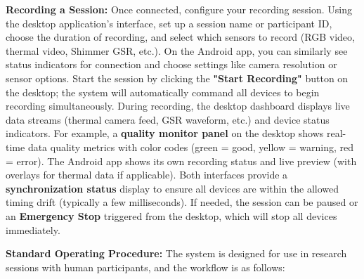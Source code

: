 \textbf{Recording a Session:} Once connected, configure your recording
session. Using the desktop application's interface, set up a session
name or participant ID, choose the duration of recording, and select
which sensors to record (RGB video, thermal video, Shimmer GSR,
etc.)\cite{GSRGuideIMotions}.
On the Android app, you can similarly see status indicators for
connection and choose settings like camera resolution or sensor options.
Start the session by clicking the \textbf{"Start Recording"} button on the
desktop; the system will automatically command all devices to begin
recording simultaneously. During recording, the desktop dashboard
displays live data streams (thermal camera feed, GSR waveform, etc.) and
device status indicators. For example, a \textbf{quality monitor panel} on
the desktop shows real-time data quality metrics with color codes (green
= good, yellow = warning, red =
error)\cite{ElectrodermalActivityWiki}.
The Android app shows its own recording status and live preview (with
overlays for thermal data if applicable). Both interfaces provide a
\textbf{synchronization status} display to ensure all devices are within the
allowed timing drift (typically a few
milliseconds)\cite{ElectrodermalActivityWiki}.
If needed, the session can be paused or an \textbf{Emergency Stop} triggered
from the desktop, which will stop all devices
immediately\cite{ElectrodermalActivityWiki}.

\textbf{Standard Operating Procedure:} The system is designed for use in
research sessions with human participants, and the workflow is as
follows\cite{ElectrodermalActivityWiki}:

